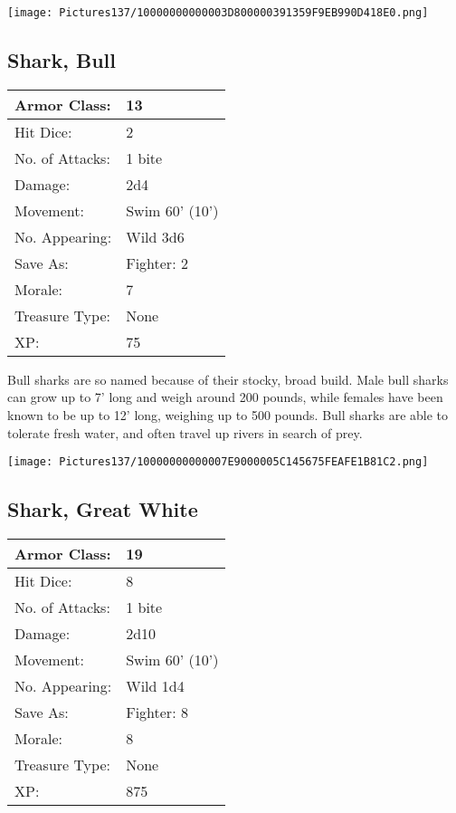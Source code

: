 \documentclass[a4paper,twoside,openany,10pt]{book}
\begin{document}
\begin{multicols}{2}
\begin{center} \texttt{[image: Pictures137/10000000000003D800000391359F9EB990D418E0.png]} \end{center}


\subsection*{Shark, Bull}\label{shark-bull}

\begin{tabularx}{0.50\textwidth}{@{}lX@{}}
Armor Class: & 13 \\\hline
Hit Dice: & 2 \\\hline
No. of Attacks: & 1 bite \\\hline
Damage: & 2d4 \\\hline
Movement: & Swim 60' (10') \\\hline
No. Appearing: & Wild 3d6 \\\hline
Save As: & Fighter: 2 \\\hline
Morale: & 7 \\\hline
Treasure Type: & None \\\hline
XP: & 75 \\\hline
\end{tabularx}\medskip

Bull sharks are so named because of their stocky, broad build. Male bull sharks can grow up to 7' long and weigh around 200 pounds, while females have been known to be up to 12' long, weighing up to 500 pounds. Bull sharks are able to tolerate fresh water, and often travel up rivers in search of prey.

\begin{center} \texttt{[image: Pictures137/10000000000007E9000005C145675FEAFE1B81C2.png]} \end{center}

\subsection*{Shark, Great White}\label{shark-great-white}

\begin{tabularx}{0.50\textwidth}{@{}lX@{}}
Armor Class: & 19 \\\hline
Hit Dice: & 8 \\\hline
No. of Attacks: & 1 bite \\\hline
Damage: & 2d10 \\\hline
Movement: & Swim 60' (10') \\\hline
No. Appearing: & Wild 1d4 \\\hline
Save As: & Fighter: 8 \\\hline
Morale: & 8 \\\hline
Treasure Type: & None \\\hline
XP: & 875 \\\hline
\end{tabularx}


\end{multicols}
\end{document}
